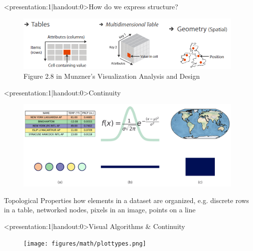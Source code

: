 \documentclass[xcolor={dvipsnames}]{beamer}
\begin{document}
\begin{frame}<presentation:1|handout:0>{How do we express structure?} 
    \begin{figure}
        \includegraphics[width=1\textwidth]{figures/intro/munzner_datatypes.png}
        \caption{Figure 2.8 in Munzner's Visualization Analysis and Design\cite{munznerVisualizationAnalysisDesign2014}}
    \end{figure}
\end{frame}

\begin{frame}<presentation:1|handout:0>{Continuity}
    \begin{figure}
        \includegraphics[width=\linewidth]{../paper/figures/k_different_types.png}
    \end{figure}
    \begin{block}{Topological Properties \cite{wilkinsonGrammarGraphics2005}}
        how elements in a dataset are organized, e.g. discrete rows in a table, networked nodes, pixels in an image, points on a line
    \end{block}
\end{frame}

\begin{frame}<presentation:1|handout:0>{Visual Algorithms \& Continuity}
    \begin{figure}
        \texttt{[image: figures/math/plottypes.png]}
    \end{figure}
\end{frame}
\end{document}
